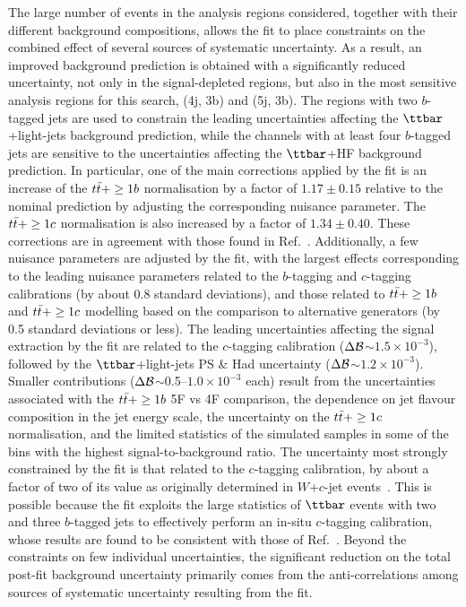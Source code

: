 The large number of events in the analysis regions considered, together with their different background compositions, allows
the fit to place constraints on the combined effect of several sources of systematic uncertainty. 
As a result, an improved background prediction is obtained with a significantly reduced uncertainty, not only in the 
signal-depleted regions, but also in the most sensitive analysis regions for this search, (4j, 3b) and (5j, 3b).
The regions with two $b$-tagged jets are used to constrain the leading uncertainties affecting the $\ttbar$+light-jets background prediction,
while the channels with at least four $b$-tagged jets are sensitive to the uncertainties affecting the $\ttbar$+HF background prediction.  
In particular, one of the main corrections applied by the fit is an increase of the $t\bar{t}+\geq1b$ normalisation by a factor of $1.17 \pm  0.15$ 
relative to the nominal prediction by adjusting the corresponding nuisance parameter.  The $t\bar{t}+\geq1c$ normalisation is also increased
by a factor of $1.34 \pm  0.40$. These corrections are in agreement with those found in Ref.~\cite{Aaboud:2017rss}.
Additionally, a few nuisance parameters are adjusted by the fit, with the largest effects corresponding to the 
leading nuisance parameters related to the $b$-tagging and $c$-tagging calibrations (by about 0.8 standard deviations),
and those related to $t\bar{t}+\geq1b$ and $t\bar{t}+\geq1c$ modelling based on the comparison to alternative generators (by 0.5 standard deviations or less).
The leading uncertainties affecting the signal extraction by the fit are related to the $c$-tagging calibration ($\Delta\mathcal{B}$$\sim$$1.5 \times 10^{-3}$),
followed by the $\ttbar$+light-jets PS \& Had uncertainty ($\Delta\mathcal{B}$$\sim$$1.2 \times 10^{-3}$). Smaller contributions ($\Delta\mathcal{B}$$\sim$0.5--$1.0 \times 10^{-3}$ each)
result from the uncertainties associated with the $t\bar{t}+\geq1b$ 5F vs 4F comparison, the dependence on jet flavour composition in the jet energy scale, 
the uncertainty on the $t\bar{t}+\geq1c$ normalisation, and the limited statistics of the simulated samples in some of the bins with the highest signal-to-background ratio.
The uncertainty most strongly constrained by the fit is that related to the $c$-tagging calibration, by about a factor of two of its value as originally determined
in $W$+$c$-jet events~\cite{Aad:2015ydr}. This is possible because the fit exploits the large statistics of $\ttbar$ events with two and three $b$-tagged jets 
to effectively perform an in-situ $c$-tagging calibration, whose results are found to be consistent with those of Ref.~\cite{ATLAS-CONF-2018-001}. 
Beyond the constraints on few individual uncertainties, the significant reduction on the total post-fit background uncertainty 
primarily comes from the anti-correlations among sources of systematic uncertainty resulting from the fit.

